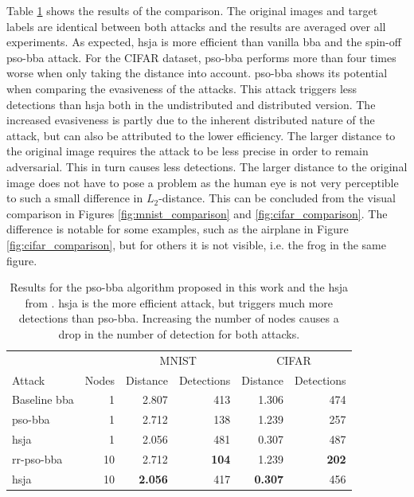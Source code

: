 Table \ref{tbl:hsja} shows the results of the comparison. The original images and target labels are identical between both attacks and the results are averaged over all experiments. As expected, \gls{hsja} is more efficient than vanilla \gls{bba} and the spin-off \gls{pso}-\gls{bba} attack. For the CIFAR dataset, \gls{pso}-\gls{bba} performs more than four times worse when only taking the distance into account. \gls{pso}-\gls{bba} shows its potential when comparing the evasiveness of the attacks. This attack triggers less detections than \gls{hsja} both in the undistributed and distributed version. The increased evasiveness is partly due to the inherent distributed nature of the attack, but can also be attributed to the lower efficiency. The larger distance to the original image requires the attack to be less precise in order to remain adversarial. This in turn causes less detections. The larger distance to the original image does not have to pose a problem as the human eye is not very perceptible to such a small difference in $L_2$-distance. This can be concluded from the visual comparison in Figures \ref{fig:mnist_comparison} and \ref{fig:cifar_comparison}. The difference is notable for some examples, such as the airplane in Figure \ref{fig:cifar_comparison}, but for others it is not visible, i.e. the frog in the same figure.\\ 

\begin{table}
\centering
\caption[Comparison with state of the art]{Results for the \gls{pso}-\gls{bba} algorithm proposed in this work and the \gls{hsja} from \cite{hsja}. \gls{hsja} is the more efficient attack, but triggers much more detections than \gls{pso}-\gls{bba}. Increasing the number of nodes causes a drop in the number of detection for both attacks.}
\label{tbl:hsja}
\begin{tabular}{lrrrrr}\toprule
			&& \multicolumn{2}{c}{MNIST} &\multicolumn{2}{c}{CIFAR} \\ \cmidrule(r){3-4} \cmidrule(r){5-6}
	Attack				&Nodes &Distance	&Detections	&Distance	&Detections \\ \midrule
	Baseline \gls{bba}			  &1			&2.807		&413		&1.306			&474 \\
	\gls{pso}-\gls{bba} 		  &1			&2.712		&138		&1.239	&257 \\ 
	\gls{hsja} &1 &2.056&481&0.307&487\\ \addlinespace[\linespace]
	\gls{rr}-\gls{pso}-\gls{bba} &10		&2.712		&\textbf{104}			&1.239			&\textbf{202} \\
	\gls{hsja} &10 &\textbf{2.056}&417&\textbf{0.307}&456\\
	\bottomrule
	\end{tabular}
\end{table}



